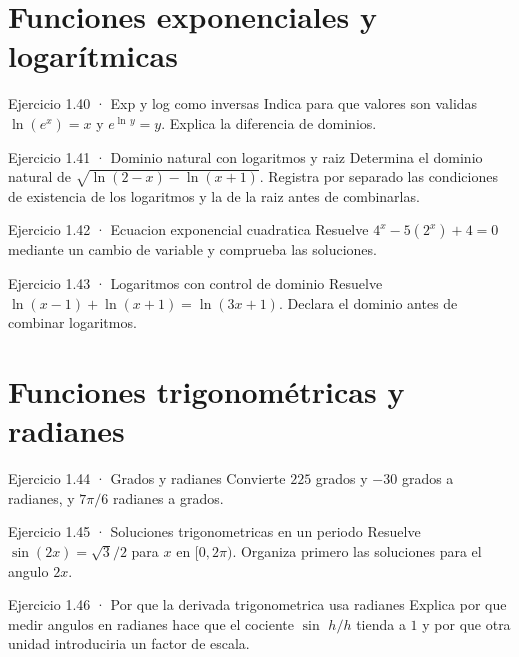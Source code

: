 \documentclass[10pt,a4paper,oneside,openany]{book}
\begin{document}
\section{Funciones exponenciales y logarítmicas}
\begin{PSevenExerciseFixed}{Ejercicio 1.40 · Exp y log como inversas}
Indica para que valores son validas \(\ln(e^x)=x\) y \(e^{\ln\,y}=y\). Explica la diferencia de dominios.
\end{PSevenExerciseFixed}
\begin{PSevenExerciseFixed}{Ejercicio 1.41 · Dominio natural con logaritmos y raiz}
Determina el dominio natural de \(\sqrt{\ln(2-x)-\ln(x+1)}\). Registra por separado las condiciones de existencia de los logaritmos y la de la raiz antes de combinarlas.
\end{PSevenExerciseFixed}
\begin{PSevenExerciseFixed}{Ejercicio 1.42 · Ecuacion exponencial cuadratica}
Resuelve \(4^x-5(2^x)+4=0\) mediante un cambio de variable y comprueba las soluciones.
\end{PSevenExerciseFixed}
\begin{PSevenExerciseFixed}{Ejercicio 1.43 · Logaritmos con control de dominio}
Resuelve \(\ln(x-1)+\ln(x+1)=\ln(3x+1)\). Declara el dominio antes de combinar logaritmos.
\end{PSevenExerciseFixed}
\section{Funciones trigonométricas y radianes}
\begin{PSevenExerciseFixed}{Ejercicio 1.44 · Grados y radianes}
Convierte \(225\) grados y \(-30\) grados a radianes, y \(7\pi /6\) radianes a grados.
\end{PSevenExerciseFixed}
\begin{PSevenExerciseFixed}{Ejercicio 1.45 · Soluciones trigonometricas en un periodo}
Resuelve \(\sin(2x)=\sqrt{3}/2\) para \(x\) en \([0,2\pi )\). Organiza primero las soluciones para el angulo \(2x\).
\end{PSevenExerciseFixed}
\begin{PSevenExerciseFixed}{Ejercicio 1.46 · Por que la derivada trigonometrica usa radianes}
Explica por que medir angulos en radianes hace que el cociente \(\sin\) \(h/h\) tienda a \(1\) y por que otra unidad introduciria un factor de escala.
\end{PSevenExerciseFixed}
\end{document}
